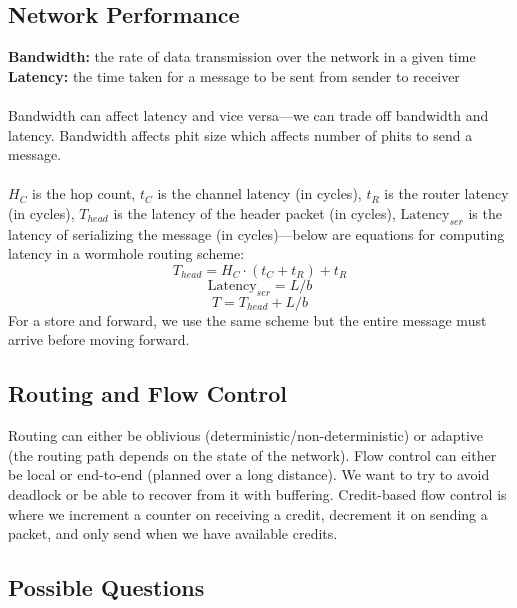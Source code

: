 \documentclass{article}
\begin{document}
\subsection{Network Performance}

\textbf{Bandwidth:} the rate of data transmission over the network in a given time \\
\textbf{Latency:} the time taken for a message to be sent from sender to receiver \\
\\
Bandwidth can affect latency and vice versa---we can trade off bandwidth and latency. Bandwidth affects phit size which affects number of phits to send a message. \\
\\
$H_C$ is the hop count, $t_C$ is the channel latency (in cycles), $t_R$ is the router latency (in cycles), $T_{head}$ is the latency of the header packet (in cycles), $\text{Latency}_{ser}$ is the latency of serializing the message (in cycles)---below are equations for computing latency in a wormhole routing scheme:
$$ T_{head} = H_C \cdot (t_C + t_R) + t_R $$
$$ \text{Latency}_{ser} = L/b $$
$$ T = T_{head} + L/b $$
For a store and forward, we use the same scheme but the entire message must arrive before moving forward.

\subsection{Routing and Flow Control}

Routing can either be oblivious (deterministic/non-deterministic) or adaptive (the routing path depends on the state of the network). Flow control can either be local or end-to-end (planned over a long distance). We want to try to avoid deadlock or be able to recover from it with buffering. Credit-based flow control is where we increment a counter on receiving a credit, decrement it on sending a packet, and only send when we have available credits.

\subsection{Possible Questions}
\end{document}
